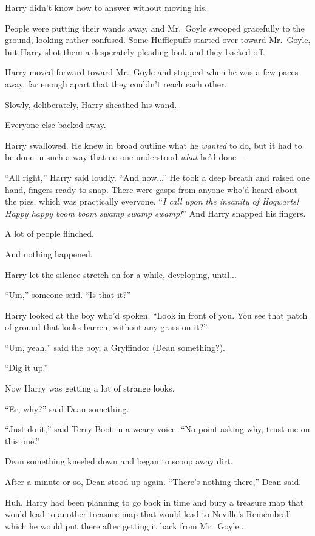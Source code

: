 Harry didn’t know how to answer without moving his.

People were putting their wands away, and Mr.~Goyle swooped gracefully to the ground, looking rather confused. Some Hufflepuffs started over toward Mr.~Goyle, but Harry shot them a desperately pleading look and they backed off.

Harry moved forward toward Mr.~Goyle and stopped when he was a few paces away, far enough apart that they couldn’t reach each other.

Slowly, deliberately, Harry sheathed his wand.

Everyone else backed away.

Harry swallowed. He knew in broad outline what he \emph{wanted} to do, but it had to be done in such a way that no one understood \emph{what} he’d done—

“All right,” Harry said loudly. “And now...” He took a deep breath and raised one hand, fingers ready to snap. There were gasps from anyone who’d heard about the pies, which was practically everyone. “\emph{I call upon the insanity of Hogwarts! Happy happy boom boom swamp swamp swamp!}” And Harry snapped his fingers.

A lot of people flinched.

And nothing happened.

Harry let the silence stretch on for a while, developing, until...

“Um,” someone said. “Is that it?”

Harry looked at the boy who’d spoken. “Look in front of you. You see that patch of ground that looks barren, without any grass on it?”

“Um, yeah,” said the boy, a Gryffindor (Dean something?).

“Dig it up.”

Now Harry was getting a lot of strange looks.

“Er, why?” said Dean something.

“Just do it,” said Terry Boot in a weary voice. “No point asking why, trust me on this one.”

Dean something kneeled down and began to scoop away dirt.

After a minute or so, Dean stood up again. “There’s nothing there,” Dean said.

Huh. Harry had been planning to go back in time and bury a treasure map that would lead to another treasure map that would lead to Neville’s Remembrall which he would put there after getting it back from Mr.~Goyle...

